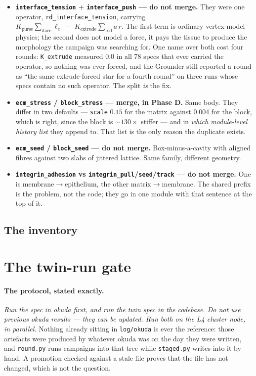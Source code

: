 \documentclass[11pt,a4paper]{article}
\newcommand{\code}[1]{\texttt{\small #1}}
\begin{document}
\begin{itemize}
\item \textbf{\code{interface\_tension} $+$ \code{interface\_push} --- do not merge.} They were one
  operator, \code{rd\_interface\_tension}, carrying
  $K_{\text{purse}}\sum_{\text{iface}} \ell_e \;-\; K_{\text{extrude}}\sum_{\text{red}} a\,r$. The
  first term is ordinary vertex-model physics; the second does not model a force, it pays the tissue
  to produce the morphology the campaign was searching for. One name over both cost four rounds:
  \code{K\_extrude} measured $0.0$ in all 78 specs that ever carried the operator, so nothing was
  ever forced, and the Grounder still reported a round as ``the same extrude-forced star for a
  fourth round'' on three runs whose specs contain no such operator. The split \emph{is} the fix.
\item \textbf{\code{ecm\_stress} / \code{block\_stress} --- merge, in Phase D.} Same body. They
  differ in two defaults --- \code{scale} $0.15$ for the matrix against $0.004$ for the block, which
  is right, since the block is ${\sim}130\times$ stiffer --- and in \emph{which module-level history
  list} they append to. That list is the only reason the duplicate exists.
\item \textbf{\code{ecm\_seed} / \code{block\_seed} --- do not merge.} Box-minus-a-cavity with
  aligned fibres against two slabs of jittered lattice. Same family, different geometry.
\item \textbf{\code{integrin\_adhesion} vs \code{integrin\_pull}/\code{seed}/\code{track} --- do not
  merge.} One is membrane$\to$epithelium, the other matrix$\to$membrane. The shared prefix is the
  problem, not the code; they go in one module with that sentence at the top of it.
\end{itemize}

\subsection{The inventory}

\optable

\section{The twin-run gate}\label{sec:twin}

\paragraph{The protocol, stated exactly.} \emph{Run the spec in okuda first, and run the twin spec in
the codebase. Do not use previous okuda results --- they can be updated. Run both on the L4 cluster
node, in parallel.} Nothing already sitting in \code{log/okuda} is ever the reference: those
artefacts were produced by whatever okuda was on the day they were written, and \code{round.py} runs
campaigns into that tree while \code{staged.py} writes into it by hand. A promotion checked against a
stale file proves that the file has not changed, which is not the question.
\end{document}
